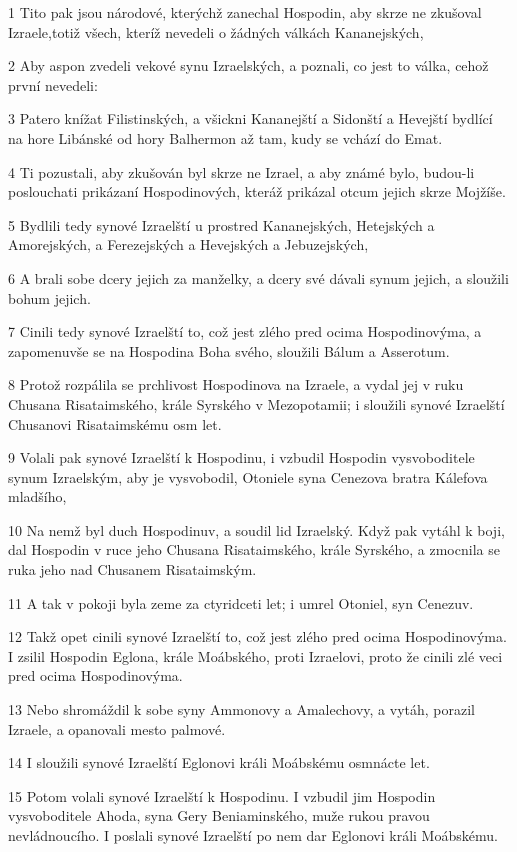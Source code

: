 \par 1 Tito pak jsou národové, kterýchž zanechal Hospodin, aby skrze ne zkušoval Izraele,totiž všech, kteríž nevedeli o žádných válkách Kananejských,
\par 2 Aby aspon zvedeli vekové synu Izraelských, a poznali, co jest to válka, cehož první nevedeli:
\par 3 Patero knížat Filistinských, a všickni Kananejští a Sidonští a Hevejští bydlící na hore Libánské od hory Balhermon až tam, kudy se vchází do Emat.
\par 4 Ti pozustali, aby zkušován byl skrze ne Izrael, a aby známé bylo, budou-li poslouchati prikázaní Hospodinových, kteráž prikázal otcum jejich skrze Mojžíše.
\par 5 Bydlili tedy synové Izraelští u prostred Kananejských, Hetejských a Amorejských, a Ferezejských a Hevejských a Jebuzejských,
\par 6 A brali sobe dcery jejich za manželky, a dcery své dávali synum jejich, a sloužili bohum jejich.
\par 7 Cinili tedy synové Izraelští to, což jest zlého pred ocima Hospodinovýma, a zapomenuvše se na Hospodina Boha svého, sloužili Bálum a Asserotum.
\par 8 Protož rozpálila se prchlivost Hospodinova na Izraele, a vydal jej v ruku Chusana Risataimského, krále Syrského v Mezopotamii; i sloužili synové Izraelští Chusanovi Risataimskému osm let.
\par 9 Volali pak synové Izraelští k Hospodinu, i vzbudil Hospodin vysvoboditele synum Izraelským, aby je vysvobodil, Otoniele syna Cenezova bratra Kálefova mladšího,
\par 10 Na nemž byl duch Hospodinuv, a soudil lid Izraelský. Když pak vytáhl k boji, dal Hospodin v ruce jeho Chusana Risataimského, krále Syrského, a zmocnila se ruka jeho nad Chusanem Risataimským.
\par 11 A tak v pokoji byla zeme za ctyridceti let; i umrel Otoniel, syn Cenezuv.
\par 12 Takž opet cinili synové Izraelští to, což jest zlého pred ocima Hospodinovýma. I zsilil Hospodin Eglona, krále Moábského, proti Izraelovi, proto že cinili zlé veci pred ocima Hospodinovýma.
\par 13 Nebo shromáždil k sobe syny Ammonovy a Amalechovy, a vytáh, porazil Izraele, a opanovali mesto palmové.
\par 14 I sloužili synové Izraelští Eglonovi králi Moábskému osmnácte let.
\par 15 Potom volali synové Izraelští k Hospodinu. I vzbudil jim Hospodin vysvoboditele Ahoda, syna Gery Beniaminského, muže rukou pravou nevládnoucího. I poslali synové Izraelští po nem dar Eglonovi králi Moábskému.
